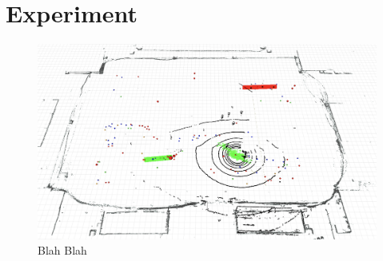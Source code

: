 \chapter{Experiment}

\begin{figure}[H]
	\centering
	\includegraphics[scale=0.33]{fig/experiment}
	\caption[Experiment results]{Blah Blah}
	\label{fig:range}
\end{figure}


\newpage